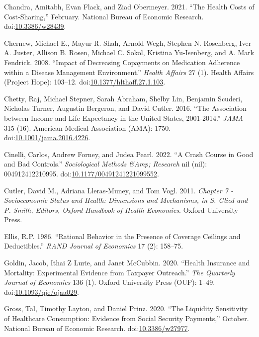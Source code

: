 \documentclass[a4paper,12pt]{article}
\begin{document}
\hypertarget{citeproc_bib_item_5}{Chandra, Amitabh, Evan Flack, and Ziad Obermeyer. 2021. “The Health Costs of Cost-Sharing,” February. National Bureau of Economic Research. doi:\href{https://doi.org/10.3386/w28439}{10.3386/w28439}.}

\hypertarget{citeproc_bib_item_6}{Chernew, Michael E., Mayur R. Shah, Arnold Wegh, Stephen N. Rosenberg, Iver A. Juster, Allison B. Rosen, Michael C. Sokol, Kristina Yu-Isenberg, and A. Mark Fendrick. 2008. “Impact of Decreasing Copayments on Medication Adherence within a Disease Management Environment.” \textit{Health Affairs} 27 (1). Health Affairs (Project Hope): 103–12. doi:\href{https://doi.org/10.1377/hlthaff.27.1.103}{10.1377/hlthaff.27.1.103}.}

\hypertarget{citeproc_bib_item_7}{Chetty, Raj, Michael Stepner, Sarah Abraham, Shelby Lin, Benjamin Scuderi, Nicholas Turner, Augustin Bergeron, and David Cutler. 2016. “The Association between Income and Life Expectancy in the United States, 2001-2014.” \textit{JAMA} 315 (16). American Medical Association (AMA): 1750. doi:\href{https://doi.org/10.1001/jama.2016.4226}{10.1001/jama.2016.4226}.}

\hypertarget{citeproc_bib_item_8}{Cinelli, Carlos, Andrew Forney, and Judea Pearl. 2022. “A Crash Course in Good and Bad Controls.” \textit{Sociological Methods \&Amp; Research} nil (nil): 004912412210995. doi:\href{https://doi.org/10.1177/00491241221099552}{10.1177/00491241221099552}.}

\hypertarget{citeproc_bib_item_9}{Cutler, David M., Adriana Lleras-Muney, and Tom Vogl. 2011. \textit{Chapter 7 - Socioeconomic Status and Health: Dimensions and Mechanisms, in S. Glied and P. Smith, Editors, Oxford Handbook of Health Economics}. Oxford University Press.}

\hypertarget{citeproc_bib_item_10}{Ellis, R.P. 1986. “Rational Behavior in the Presence of Coverage Ceilings and Deductibles.” \textit{RAND Journal of Economics} 17 (2): 158–75.}

\hypertarget{citeproc_bib_item_11}{Goldin, Jacob, Ithai Z Lurie, and Janet McCubbin. 2020. “Health Insurance and Mortality: Experimental Evidence from Taxpayer Outreach.” \textit{The Quarterly Journal of Economics} 136 (1). Oxford University Press (OUP): 1–49. doi:\href{https://doi.org/10.1093/qje/qjaa029}{10.1093/qje/qjaa029}.}

\hypertarget{citeproc_bib_item_12}{Gross, Tal, Timothy Layton, and Daniel Prinz. 2020. “The Liquidity Sensitivity of Healthcare Consumption: Evidence from Social Security Payments,” October. National Bureau of Economic Research. doi:\href{https://doi.org/10.3386/w27977}{10.3386/w27977}.}
\end{document}
